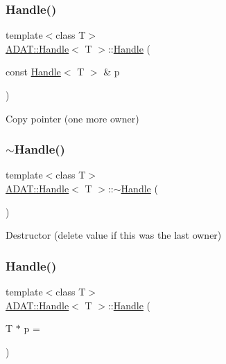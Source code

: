 \subsubsection{\texorpdfstring{Handle()}{Handle()}\hspace{0.1cm}{\footnotesize\ttfamily [2/6]}}
{\footnotesize\ttfamily template$<$class T$>$ \\
\mbox{\hyperlink{classADAT_1_1Handle}{A\+D\+A\+T\+::\+Handle}}$<$ T $>$\+::\mbox{\hyperlink{classADAT_1_1Handle}{Handle}} (\begin{DoxyParamCaption}\item[{const \mbox{\hyperlink{classADAT_1_1Handle}{Handle}}$<$ T $>$ \&}]{p }\end{DoxyParamCaption})\hspace{0.3cm}{\ttfamily [inline]}}



Copy pointer (one more owner) 

\mbox{\label{classADAT_1_1Handle_a358ca2d3df9674e7ccb416574df96ce5}} 
\subsubsection{\texorpdfstring{$\sim$Handle()}{~Handle()}\hspace{0.1cm}{\footnotesize\ttfamily [1/3]}}
{\footnotesize\ttfamily template$<$class T$>$ \\
\mbox{\hyperlink{classADAT_1_1Handle}{A\+D\+A\+T\+::\+Handle}}$<$ T $>$\+::$\sim$\mbox{\hyperlink{classADAT_1_1Handle}{Handle}} (\begin{DoxyParamCaption}{ }\end{DoxyParamCaption})\hspace{0.3cm}{\ttfamily [inline]}}



Destructor (delete value if this was the last owner) 

\mbox{\label{classADAT_1_1Handle_a510e41b73c3f685f4eb78a91020782c0}} 
\subsubsection{\texorpdfstring{Handle()}{Handle()}\hspace{0.1cm}{\footnotesize\ttfamily [3/6]}}
{\footnotesize\ttfamily template$<$class T$>$ \\
\mbox{\hyperlink{classADAT_1_1Handle}{A\+D\+A\+T\+::\+Handle}}$<$ T $>$\+::\mbox{\hyperlink{classADAT_1_1Handle}{Handle}} (\begin{DoxyParamCaption}\item[{T $\ast$}]{p = {} }\end{DoxyParamCaption})\hspace{0.3cm}{\ttfamily [inline]}}



